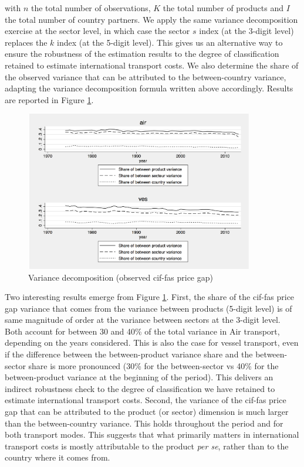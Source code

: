 \documentclass[a4paper,11pt]{article}
\begin{document}
\noindent with $n$ the total number of observations, $K$ the total number of products and $I$ the total number of country partners.
We apply the same variance decomposition exercise at the sector level, in which case the sector $s$ index (at the 3-digit level) replaces the $k$ index (at the 5-digit level).
This gives us an alternative way to ensure the robustness of the estimation results to the degree of classification retained to estimate international transport costs.
We also determine the share of the observed variance that can be attributed to the between-country variance, adapting the variance decomposition formula written above accordingly.
Results are reported in Figure \ref{fig:decomp_variance}.

\begin{figure}[htbp]
\caption{Variance decomposition (observed cif-fas price gap)}
\label{fig:decomp_variance}
\begin{center}
\includegraphics[width=10cm, height=7cm]{variance_decomposition.pdf}
\end{center}
\end{figure}

Two interesting results emerge from Figure \ref{fig:decomp_variance}.
First, the share of the cif-fas price gap variance that comes from the variance between products (5-digit level) is of same magnitude of order at the variance between sectors at the 3-digit level.
Both account for between 30 and 40\% of the total variance in Air transport, depending on the years considered.
This is also the case for vessel transport, even if the difference between the between-product variance share and the between-sector share is more pronounced (30\% for the between-sector vs 40\% for the between-product variance at the beginning of the period).
This delivers an indirect robustness check to the degree of classification we have retained to estimate international transport costs.
Second, the variance of the cif-fas price gap that can be attributed to the product (or sector) dimension is much larger than the between-country variance.
This holds throughout the period and for both transport modes.
This suggests that what primarily matters in international transport costs is mostly attributable to the product \textit{per se}, rather than to the country where it comes from.
\end{document}
